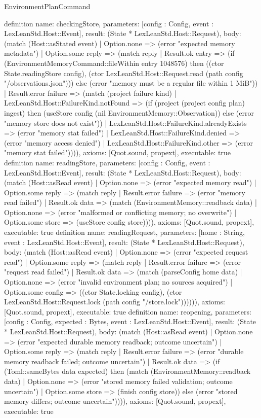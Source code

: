 \begin{lexlean}{EnvironmentPlanCommand}
\begin{semanticmodule}
definition{
 name: checkingStore, parameters: [config : Config, event : LexLeanStd.Host::Event], result: (State * LexLeanStd.Host::Request),
 body: (match (Host::asStated event) | Option.none => (error "expected memory metadata") | Option.some reply => (match reply | Result.ok entry => (if (EnvironmentMemoryCommand::fileWithin entry 1048576) then ((ctor State.readingStore config), (ctor LexLeanStd.Host::Request.read (path config "/observations.json"))) else (error "memory must be a regular file within 1 MiB")) | Result.error failure => (match (project failure kind) | LexLeanStd.Host::FailureKind.notFound => (if (project (project config plan) ingest) then (useStore config (nil EnvironmentMemory::Observation)) else (error "memory store does not exist")) | LexLeanStd.Host::FailureKind.alreadyExists => (error "memory stat failed") | LexLeanStd.Host::FailureKind.denied => (error "memory access denied") | LexLeanStd.Host::FailureKind.other => (error "memory stat failed")))), axioms: [Quot.sound, propext], executable: true
}
definition{
 name: readingStore, parameters: [config : Config, event : LexLeanStd.Host::Event], result: (State * LexLeanStd.Host::Request),
 body: (match (Host::asRead event) | Option.none => (error "expected memory read") | Option.some reply => (match reply | Result.error failure => (error "memory read failed") | Result.ok data => (match (EnvironmentMemory::readback data) | Option.none => (error "malformed or conflicting memory; no overwrite") | Option.some store => (useStore config store)))), axioms: [Quot.sound, propext], executable: true
}
definition{
 name: readingRequest, parameters: [home : String, event : LexLeanStd.Host::Event], result: (State * LexLeanStd.Host::Request),
 body: (match (Host::asRead event) | Option.none => (error "expected request read") | Option.some reply => (match reply | Result.error failure => (error "request read failed") | Result.ok data => (match (parseConfig home data) | Option.none => (error "invalid environment plan; no sources acquired") | Option.some config => ((ctor State.locking config), (ctor LexLeanStd.Host::Request.lock (path config "/store.lock")))))), axioms: [Quot.sound, propext], executable: true
}
definition{
 name: reopening, parameters: [config : Config, expected : Bytes, event : LexLeanStd.Host::Event], result: (State * LexLeanStd.Host::Request),
 body: (match (Host::asRead event) | Option.none => (error "expected durable memory readback; outcome uncertain") | Option.some reply => (match reply | Result.error failure => (error "durable memory readback failed; outcome uncertain") | Result.ok data => (if (Toml::sameBytes data expected) then (match (EnvironmentMemory::readback data) | Option.none => (error "stored memory failed validation; outcome uncertain") | Option.some store => (finish config store)) else (error "stored memory differs; outcome uncertain")))), axioms: [Quot.sound, propext], executable: true
}
\end{semanticmodule}
\end{lexlean}
